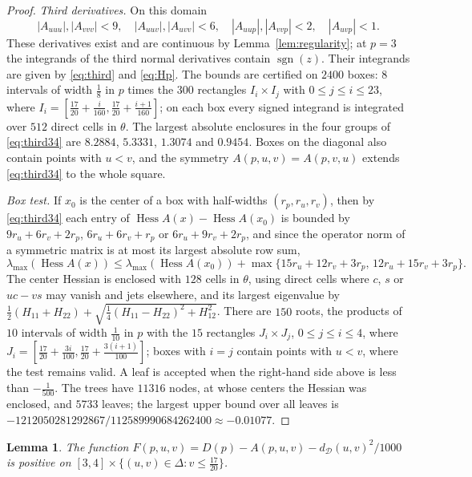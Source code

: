 \documentclass[11pt]{amsart}
\newtheorem{lemma}[theorem]{Lemma}
\theoremstyle{definition}
\theoremstyle{remark}
\numberwithin{equation}{section}
\newcommand{\sgn}{\operatorname{sgn}}
\newcommand{\Hess}{\operatorname{Hess}}
\newcommand{\cD}{\mathcal{D}}
\begin{document}
\begin{proof}
\emph{Third derivatives.} On this domain
\begin{equation}\label{eq:third34}
|A_{uuu}|,|A_{vvv}|<9,\quad |A_{uuv}|,|A_{uvv}|<6,\quad |A_{uup}|,|A_{vvp}|<2,\quad |A_{uvp}|<1.
\end{equation}
These derivatives exist and are continuous by Lemma~\ref{lem:regularity}; at $p=3$ the integrands of the third normal derivatives contain $\sgn(z)$. Their integrands are given by \eqref{eq:third} and \eqref{eq:Hp}. The bounds are certified on $2400$ boxes: $8$ intervals of width $\frac18$ in $p$ times the $300$ rectangles $I_i\times I_j$ with $0\le j\le i\le23$, where $I_i=[\frac{17}{20}+\frac i{160},\frac{17}{20}+\frac{i+1}{160}]$; on each box every signed integrand is integrated over $512$ direct cells in $\theta$. The largest absolute enclosures in the four groups of \eqref{eq:third34} are $8.2884$, $5.3331$, $1.3074$ and $0.9454$. Boxes on the diagonal also contain points with $u<v$, and the symmetry $A(p,u,v)=A(p,v,u)$ extends \eqref{eq:third34} to the whole square.

\emph{Box test.} If $x_0$ is the center of a box with half-widths $(r_p,r_u,r_v)$, then by \eqref{eq:third34} each entry of $\Hess A(x)-\Hess A(x_0)$ is bounded by $9r_u+6r_v+2r_p$, $6r_u+6r_v+r_p$ or $6r_u+9r_v+2r_p$, and since the operator norm of a symmetric matrix is at most its largest absolute row sum,
\[
\lambda_{\max}(\Hess A(x))\le\lambda_{\max}(\Hess A(x_0))+\max\{15r_u+12r_v+3r_p,\,12r_u+15r_v+3r_p\}.
\]
The center Hessian is enclosed with $128$ cells in $\theta$, using direct cells where $c$, $s$ or $uc-vs$ may vanish and jets elsewhere, and its largest eigenvalue by $\frac12(H_{11}+H_{22})+\sqrt{\frac14(H_{11}-H_{22})^2+H_{12}^2}$. There are $150$ roots, the products of $10$ intervals of width $\frac1{10}$ in $p$ with the $15$ rectangles $J_i\times J_j$, $0\le j\le i\le4$, where $J_i=[\frac{17}{20}+\frac{3i}{100},\frac{17}{20}+\frac{3(i+1)}{100}]$; boxes with $i=j$ contain points with $u<v$, where the test remains valid. A leaf is accepted when the right-hand side above is less than $-\frac1{500}$. The trees have $11316$ nodes, at whose centers the Hessian was enclosed, and $5733$ leaves; the largest upper bound over all leaves is $-1212050281292867/112589990684262400\approx-0.01077$.
\end{proof}

\begin{lemma}\label{lem:34compl}
The function $F(p,u,v)=D(p)-A(p,u,v)-d_\cD(u,v)^2/1000$ is positive on $[3,4]\times\{(u,v)\in\Delta:v\le\frac{17}{20}\}$.
\end{lemma}
\end{document}

